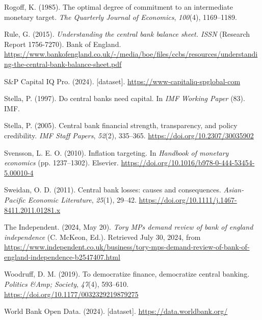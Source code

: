 \documentclass[
  a4paper,
  abstract=true]{scrartcl}
\newlength{\cslhangindent}
\newenvironment{CSLReferences}[2] %
 {\begin{list}{}{%
  \setlength{\itemindent}{0pt}
  \setlength{\leftmargin}{0pt}
  \setlength{\parsep}{0pt}
  \ifodd #1
   \setlength{\leftmargin}{\cslhangindent}
   \setlength{\itemindent}{-1\cslhangindent}
  \fi
  \setlength{\itemsep}{#2\baselineskip}}}
 {\end{list}}
\theoremstyle{definition}
\begin{document}
\begin{CSLReferences}{1}{0}
Rogoff, K. (1985). The optimal degree of commitment to an intermediate
monetary target. \emph{The Quarterly Journal of Economics},
\emph{100}(4), 1169--1189.

Rule, G. (2015). \emph{Understanding the central bank balance sheet.
ISSN} (Research Report 1756-7270). Bank of England.
\url{https://www.bankofengland.co.uk/-/media/boe/files/ccbs/resources/understanding-the-central-bank-balance-sheet.pdf}

S\&P Capital IQ Pro. (2024). {[}dataset{]}.
\url{https://www-capitaliq-spglobal-com}

Stella, P. (1997). Do central banks need capital. In \emph{IMF Working
Paper} (83). IMF.

Stella, P. (2005). Central bank financial strength, transparency, and
policy credibility. \emph{IMF Staff Papers}, \emph{52}(2), 335--365.
\url{https://doi.org/10.2307/30035902}

Svensson, L. E. O. (2010). Inflation targeting. In \emph{Handbook of
monetary economics} (pp. 1237--1302). Elsevier.
\url{https://doi.org/10.1016/b978-0-444-53454-5.00010-4}

Sweidan, O. D. (2011). Central bank losses: causes and consequences.
\emph{Asian-Pacific Economic Literature}, \emph{25}(1), 29--42.
\url{https://doi.org/10.1111/j.1467-8411.2011.01281.x}

The Independent. (2024, May 20). \emph{Tory MPs demand review of bank of
england independence} (C. McKeon, Ed.). Retrieved July 30, 2024, from
\url{https://www.independent.co.uk/business/tory-mps-demand-review-of-bank-of-england-independence-b2547407.html}

Woodruff, D. M. (2019). To democratize finance, democratize central
banking. \emph{Politics \&Amp; Society}, \emph{47}(4), 593--610.
\url{https://doi.org/10.1177/0032329219879275}

World Bank Open Data. (2024). {[}dataset{]}.
\url{https://data.worldbank.org/}

\end{CSLReferences}

\appendix
\newpage
\end{document}
